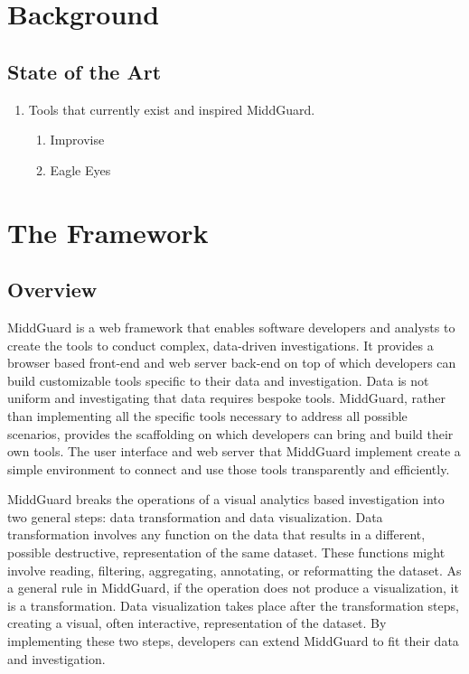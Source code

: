 \documentclass[midd]{thesis}
\begin{document}
\chapter{Background}

\section{State of the Art}
  \begin{enumerate}
    \item Tools that currently exist and inspired MiddGuard.
    \begin{enumerate}
      \item Improvise
      \item Eagle Eyes
    \end{enumerate}
  \end{enumerate}

\chapter{The Framework}

\section{Overview}

MiddGuard is a web framework that enables software developers and analysts to
create the tools to conduct complex, data-driven investigations. It provides a
browser based front-end and web server back-end on top of which developers can
build customizable tools specific to their data and investigation. Data is not
uniform and investigating that data requires bespoke tools. MiddGuard,
rather than implementing all the specific tools necessary to address all
possible scenarios, provides the scaffolding on which developers can bring and
build their own tools. The user interface and web server that MiddGuard
implement create a simple environment to connect and use those tools
transparently and efficiently.

MiddGuard breaks the operations of a visual analytics based investigation into
two general steps: data transformation and data visualization. Data
transformation involves any function on the data that results in a different,
possible destructive, representation of the same dataset. These functions might
involve reading, filtering, aggregating, annotating, or reformatting the
dataset. As a general rule in MiddGuard, if the operation does not produce a
visualization, it is a transformation. Data visualization takes place after the
transformation steps, creating a visual, often interactive, representation of
the dataset. By implementing these two steps, developers can extend MiddGuard to
fit their data and investigation.
\end{document}
